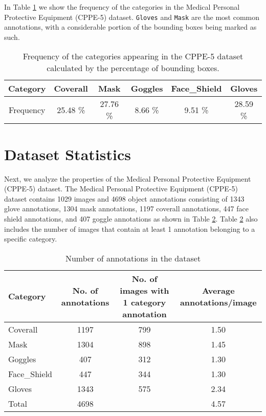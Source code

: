 \documentclass{article}
\newcommand{\cls}[1]{\texttt{#1}}
\begin{document}
In Table \ref{tab:frequency-labels} we show the frequency of the categories in the Medical Personal Protective Equipment (CPPE-5) dataset. \cls{Gloves} and \cls{Mask} are the most common annotations, with a considerable portion of the bounding boxes being marked as such.

\begin{table}[ht]
    \caption{Frequency of the categories appearing in the CPPE-5 dataset calculated by the percentage of bounding boxes.}
    \centering
    \begin{tabular}{cccccc}
    \toprule
    Category & Coverall & Mask & Goggles & Face\_Shield & Gloves \\
    \midrule
    Frequency & 25.48 \% & 27.76 \% & 8.66 \% & 9.51 \% & 28.59 \% \\ 
    \bottomrule
    \end{tabular}
    \label{tab:frequency-labels}
\end{table}

\section{Dataset Statistics}
\label{Dataset Statistics}

Next, we analyze the properties of the Medical Personal Protective Equipment (CPPE-5) dataset. The Medical Personal Protective Equipment (CPPE-5) dataset contains 1029 images and 4698 object annotations consisting of 1343 glove annotations, 1304 mask annotations, 1197 coverall annotations,  447 face shield annotations, and 407 goggle annotations as shown in Table \ref{tab:annotations}. Table \ref{tab:annotations} also includes the number of images that contain at least 1 annotation belonging to a specific category.

\begin{table}
    \caption{Number of annotations in the dataset}
    \centering
    \begin{tabularx}{\textwidth}{lccc}
    \toprule
    Category     &   No. of annotations & No. of images with  1 category annotation & Average annotations/image \\
    \midrule
     Coverall    &   1197 & 799 & 1.50 \\
     Mask        &   1304 & 898 & 1.45 \\
     Goggles     &    407 & 312 & 1.30 \\
     Face\_Shield &    447 & 344 & 1.30 \\
     Gloves      &   1343 & 575 & 2.34 \\
    \midrule
     Total       &   4698 & & 4.57 \\
    \bottomrule
    \end{tabularx}
    \label{tab:annotations}
\end{table}
\end{document}
